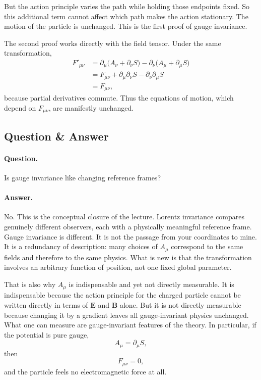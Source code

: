 But the action principle varies the path while holding those endpoints fixed. So this additional term cannot affect which path makes the action stationary. The motion of the particle is unchanged. This is the first proof of gauge invariance.

The second proof works directly with the field tensor. Under the same transformation,
\begin{align}
F'_{\mu\nu}
&=
\partial_\mu\bigl(A_\nu+\partial_\nu S\bigr)
-
\partial_\nu\bigl(A_\mu+\partial_\mu S\bigr) \\
&=
F_{\mu\nu}
+
\partial_\mu\partial_\nu S
-
\partial_\nu\partial_\mu S \\
&=
F_{\mu\nu},
\end{align}
because partial derivatives commute. Thus the equations of motion, which depend on \(F_{\mu\nu}\), are manifestly unchanged.

\subsection{Question \& Answer}

\paragraph{Question.}
Is gauge invariance like changing reference frames?

\paragraph{Answer.}
No. This is the conceptual closure of the lecture. Lorentz invariance compares genuinely different observers, each with a physically meaningful reference frame. Gauge invariance is different. It is not the passage from your coordinates to mine. It is a redundancy of description: many choices of \(A_\mu\) correspond to the same fields and therefore to the same physics. What is new is that the transformation involves an arbitrary function of position, not one fixed global parameter.

That is also why \(A_\mu\) is indispensable and yet not directly measurable. It is indispensable because the action principle for the charged particle cannot be written directly in terms of \(\mathbf E\) and \(\mathbf B\) alone. But it is not directly measurable because changing it by a gradient leaves all gauge-invariant physics unchanged. What one can measure are gauge-invariant features of the theory. In particular, if the potential is pure gauge,
\begin{equation}
A_\mu=\partial_\mu S,
\end{equation}
then
\begin{equation}
F_{\mu\nu}=0,
\end{equation}
and the particle feels no electromagnetic force at all.

